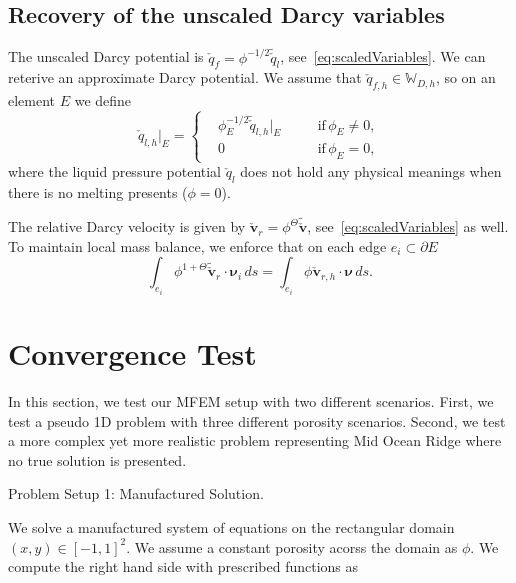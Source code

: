 \subsection{Recovery of the unscaled Darcy variables}
The unscaled Darcy potential is $\check{q}_f = \phi^{-1/2}\tilde{\check{q}}_l$, see~\eqref{eq:scaledVariables}. 
We can reterive an approximate Darcy potential. We assume that $\check{q}_{f,h} \in \mathbb{W}_{D,h}$, so on
an element $E$ we define
\begin{equation}
		  \check{q}_{l,h}\rvert_{E} = \left\{
					 \begin{alignedat}{2}
								&\phi_E^{-1/2} \tilde{\check{q}}_{l,h}\lvert_E \quad &&\text{if}\, \phi_E \neq 0,\\
								&0                                                   &&\text{if}\, \phi_E = 0,
					 \end{alignedat}
					 \right.
\end{equation}
where the liquid pressure potential $\check{q}_l$ does not hold any physical 
meanings when there is no melting presents ($\phi = 0$).

The relative Darcy velocity is given by $\check{\mathbf{v}}_r = \phi^{\Theta} \tilde{\check{\mathbf{v}}}$, 
see~\eqref{eq:scaledVariables} as well. To maintain local mass balance, we 
enforce that on each edge $e_i \subset \partial E$
\begin{equation}
		  \int_{e_i} \phi^{1+\Theta} \tilde{\check{\mathbf{v}}}_r \cdot \pmb{\nu}_i\, ds = \int_{e_i} \phi \check{\mathbf{v}}_{r,h} \cdot \pmb{\nu} \, ds.
\end{equation}
\fi



\section{Convergence Test}
\iffalse
In this section, we test our MFEM setup with two different scenarios.
First, we test a pseudo 1D problem with three different
porosity scenarios.
Second, we test a
more complex yet more realistic problem representing Mid Ocean Ridge where
no true solution is presented.

Problem Setup 1: Manufactured Solution.

We solve a manufactured system of equations on the rectangular domain 
$(x,y) \in [-1,1]^2$. We assume a constant porosity acorss the domain as
$\phi$. We compute the right hand side with prescribed functions as

